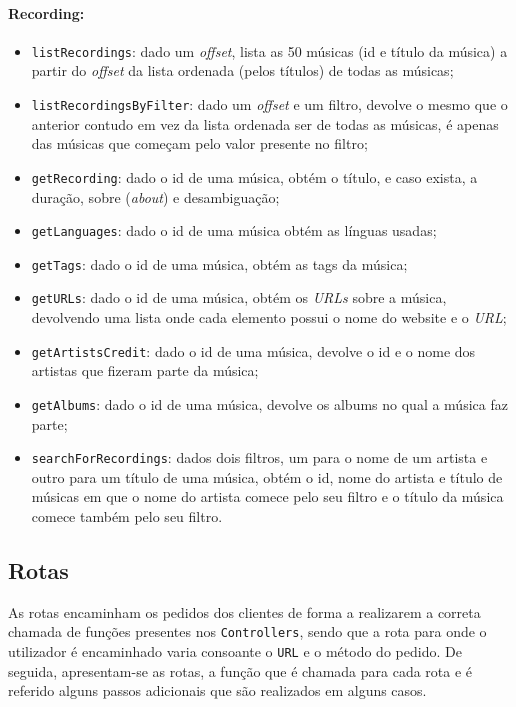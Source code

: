 \documentclass{article}
\begin{document}
\paragraph{\textbf{Recording:}}
    \begin{itemize}
        \item \texttt{listRecordings}: dado um \textit{offset}, lista as 50 músicas (id e título da música) a partir do \textit{offset} da lista ordenada (pelos títulos) de todas as músicas;
        \item \texttt{listRecordingsByFilter}: dado um \textit{offset} e um filtro, devolve o mesmo que o anterior contudo em vez da lista ordenada ser de todas as músicas, é apenas das músicas que começam pelo valor presente no filtro;
        \item \texttt{getRecording}: dado o id de uma música, obtém o título, e caso exista, a duração, sobre (\textit{about}) e desambiguação;
        \item \texttt{getLanguages}: dado o id de uma música obtém as línguas usadas;
        \item \texttt{getTags}: dado o id de uma música, obtém as tags da música;
        \item \texttt{getURLs}: dado o id de uma música, obtém os \textit{URLs} sobre a música, devolvendo uma lista onde cada elemento possui o nome do website e o \textit{URL};
        \item \texttt{getArtistsCredit}: dado o id de uma música, devolve o id e o nome dos artistas que fizeram parte da música;
        \item \texttt{getAlbums}: dado o id de uma música, devolve os albums no qual a música faz parte;
        \item \texttt{searchForRecordings}: dados dois filtros, um para o nome de um artista e outro para um título de uma música, obtém o id, nome do artista e título de músicas em que o nome do artista comece pelo seu filtro e o título da música comece também pelo seu filtro.
    \end{itemize}

\subsection{Rotas}

As rotas encaminham os pedidos dos clientes de forma a realizarem a correta chamada de funções presentes nos \texttt{Controllers}, sendo que a rota para onde o utilizador é encaminhado varia consoante o \texttt{URL} e o método do pedido.
De seguida, apresentam-se as rotas, a função que é chamada para cada rota e é referido alguns passos adicionais que são realizados em alguns casos.
\end{document}
